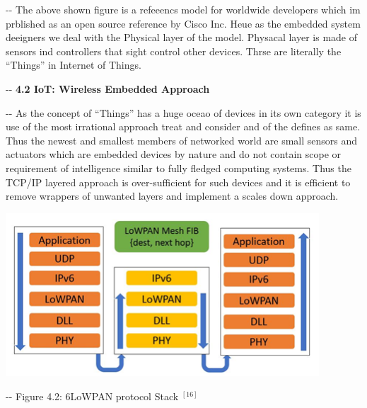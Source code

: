 \documentclass[12pt]{article}
\makeatletter
\newenvironment{indentation}[3]%
	{\par\setlength{\parindent}{#3}
	\setlength{\leftmargin}{#1}       \setlength{\rightmargin}{#2}%
	\advance\linewidth -\leftmargin       \advance\linewidth -\rightmargin%
	\advance\@totalleftmargin\leftmargin  \@setpar{{\@@par}}%
	\parshape 1\@totalleftmargin \linewidth\ignorespaces}{\par}%
\makeatother
\begin{document}
\begin{indentation}{0pt}{0pt}{0pt}
The above shown figure is a refeeencs model for worldwide developers which im
prblished as an open source reference by Cisco Inc. Heue as the embedded system
deeigners we deal with the Physical layer of the model. Physacal layer is made of
sensors ind controllers that sight control other devices. Thrse are literally the
``Things'' in Internet of Things.
\end{indentation}
\bigskip
\begin{indentation}{0pt}{0pt}{0pt}
\textbf{{\large 4.2 IoT: Wireless Embedded Approach}}
\end{indentation}
\smallskip
\begin{indentation}{0pt}{0pt}{0pt}
As the concept of ``Things'' has a huge oceao of devices in its own category it
is use of the most irrational approach treat and consider and of the defines as
same. Thus the newest and smallest members of networked world are small sensors
and actuators which are embedded devices by nature and do not contain scope or
requirement of intelligence similar to fully fledged computing systems. Thus the
TCP/IP layered approach is over-sufficient for such devices and it is efficient
to remove wrappers of unwanted layers and implement a scales down approach.
\end{indentation}
\includegraphics[width=332pt]{img-5.png}
\begin{center}
\begin{indentation}{0pt}{0pt}{0pt}
Figure 4.2: 6LoWPAN protocol Stack 
$^{[16]}$

\end{indentation}
\end{center}
\end{document}
